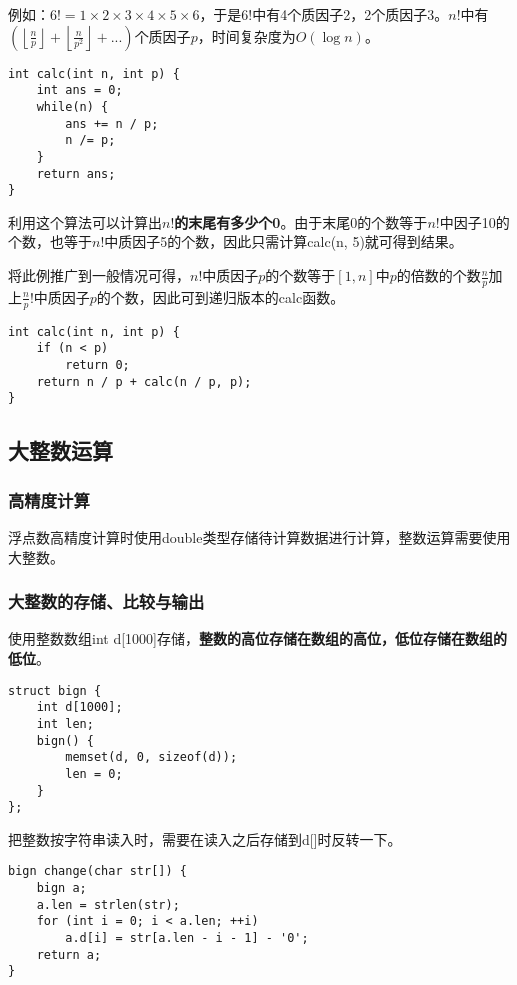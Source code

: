 例如：$6!=1\times2\times3\times4\times5\times6$，于是6!中有4个质因子2，2个质因子3。$n!$中有$\displaystyle{\left( \left\lfloor \frac{n}{p} \right\rfloor + \left\lfloor \frac{n}{p^2} \right\rfloor  + ...\right)}$个质因子$p$，时间复杂度为$O(\log n)$。

\begin{lstlisting}
int calc(int n, int p) {
	int ans = 0;
	while(n) {
		ans += n / p;
		n /= p;
	}
	return ans;
}
\end{lstlisting}

利用这个算法可以计算出\textbf{$n!$的末尾有多少个0}。由于末尾0的个数等于$n!$中因子10的个数，也等于$n!$中质因子5的个数，因此只需计算calc(n, 5)就可得到结果。

将此例推广到一般情况可得，$n!$中质因子$p$的个数等于$[1,n]$中$p$的倍数的个数$\displaystyle{\frac{n}{p}}$加上$\displaystyle{\frac{n}{p}!}$中质因子$p$的个数，因此可到递归版本的calc函数。

\begin{lstlisting}
int calc(int n, int p) {
	if (n < p)
		return 0;
	return n / p + calc(n / p, p);
}
\end{lstlisting}

\subsection{大整数运算}

\subsubsection{高精度计算}

浮点数高精度计算时使用double类型存储待计算数据进行计算，整数运算需要使用大整数。

\subsubsection{大整数的存储、比较与输出}

使用整数数组int d[1000]存储，\textbf{整数的高位存储在数组的高位，低位存储在数组的低位}。

\begin{lstlisting}
struct bign {
	int d[1000];
	int len;
	bign() {
		memset(d, 0, sizeof(d));
		len = 0;
	}
};
\end{lstlisting}

把整数按字符串读入时，需要在读入之后存储到d[]时反转一下。

\begin{lstlisting}
bign change(char str[]) {
	bign a;
	a.len = strlen(str);
	for (int i = 0; i < a.len; ++i)
		a.d[i] = str[a.len - i - 1] - '0';
	return a;
}
\end{lstlisting}

